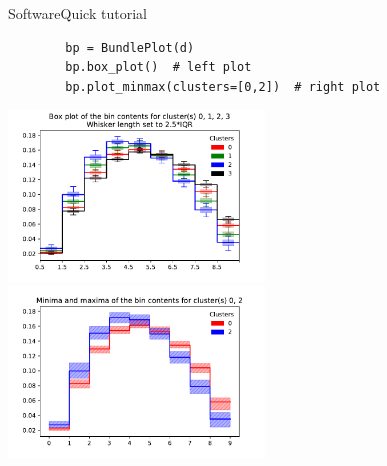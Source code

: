 \begin{frame}[fragile]{Software}{Quick tutorial}
    \begin{verbatim}
        bp = BundlePlot(d)
        bp.box_plot()  # left plot
        bp.plot_minmax(clusters=[0,2])  # right plot
    \end{verbatim}
    
    \bigskip
    \begin{changemargin}{-1.2cm}{-1.2cm}
        \includegraphics[width=6.8cm]{figures/plots/box_plot.pdf}\hspace{-0.5cm}
        \includegraphics[width=6.8cm]{figures/plots/plot_minmax_02.pdf}\\
    \end{changemargin}
\end{frame}
